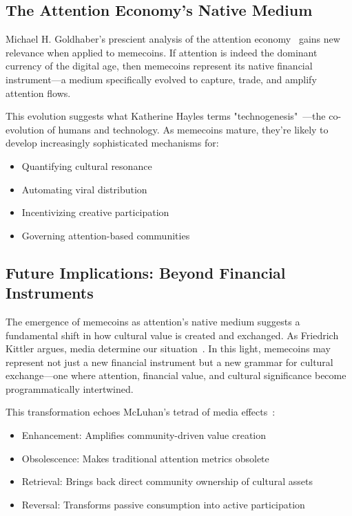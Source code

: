 \documentclass[a4paper,12pt]{article}
\begin{document}
\subsection{The Attention Economy's Native Medium}

Michael H. Goldhaber's prescient analysis of the attention economy~\cite{goldhaber1997attention} gains new relevance when applied to memecoins. If attention is indeed the dominant currency of the digital age, then memecoins represent its native financial instrument—a medium specifically evolved to capture, trade, and amplify attention flows.

This evolution suggests what Katherine Hayles terms "technogenesis"~\cite{hayles2012technogenesis}—the co-evolution of humans and technology. As memecoins mature, they're likely to develop increasingly sophisticated mechanisms for:

\begin{itemize}
    \item Quantifying cultural resonance
    \item Automating viral distribution
    \item Incentivizing creative participation
    \item Governing attention-based communities
\end{itemize}

\subsection{Future Implications: Beyond Financial Instruments}

The emergence of memecoins as attention's native medium suggests a fundamental shift in how cultural value is created and exchanged. As Friedrich Kittler argues, media determine our situation~\cite{kittler1999gramophone}. In this light, memecoins may represent not just a new financial instrument but a new grammar for cultural exchange—one where attention, financial value, and cultural significance become programmatically intertwined.

This transformation echoes McLuhan's tetrad of media effects~\cite{mcluhan1988laws}:

\begin{itemize}
    \item Enhancement: Amplifies community-driven value creation
    \item Obsolescence: Makes traditional attention metrics obsolete
    \item Retrieval: Brings back direct community ownership of cultural assets
    \item Reversal: Transforms passive consumption into active participation
\end{itemize}
\end{document}
